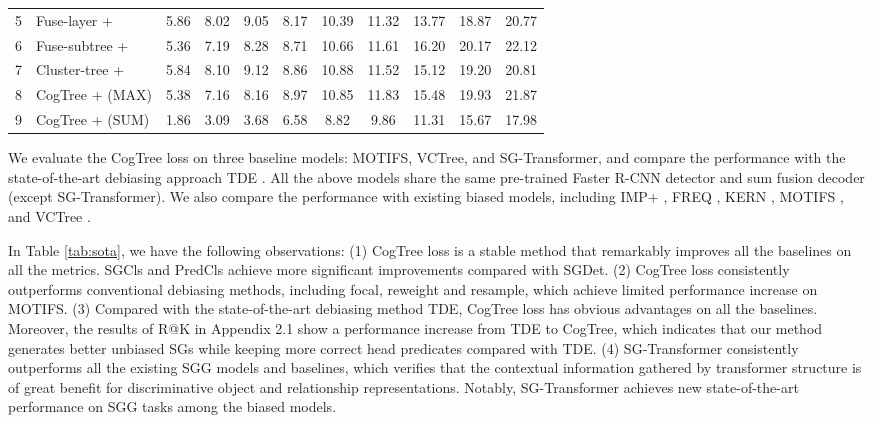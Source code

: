 \documentclass[letterpaper]{article} \usepackage{aaai21}  \usepackage{times}  \usepackage{helvet} \usepackage{courier}  \usepackage[hyphens]{url}  \usepackage{graphicx} \urlstyle{rm} \def\UrlFont{\rm}  \usepackage{natbib}  \usepackage{caption} \frenchspacing  \setlength{\pdfpagewidth}{8.5in}  \setlength{\pdfpageheight}{11in}  \usepackage{amsmath,amsthm}
\begin{document}
\begin{table*}[t]
{\begin{tabular}{llccccccccc}
\\ 
\hline
\multicolumn{1}{l|}{5} & \multicolumn{1}{l|}{Fuse-layer + } & 5.86  & 8.02 & \multicolumn{1}{c|}{9.05}    & 8.17   & 10.39  & \multicolumn{1}{c|}{11.32}   & 13.77         & 18.87        & 20.77          
\\ 
\multicolumn{1}{l|}{6} & \multicolumn{1}{l|}{Fuse-subtree + }  & 5.36  & 7.19  & \multicolumn{1}{c|}{8.28}   & 8.71  & 10.66  & \multicolumn{1}{c|}{11.61}   & 16.20         & 20.17        & 22.12         \\
\multicolumn{1}{l|}{7} & \multicolumn{1}{l|}{Cluster-tree + }  & 5.84  & 8.10 & \multicolumn{1}{c|}{9.12}   & 8.86  & 10.88  & \multicolumn{1}{c|}{11.52}   & 15.12         & 19.20        & 20.81         \\
\hline
\multicolumn{1}{l|}{8} & \multicolumn{1}{l|}{CogTree + (MAX)}  & 5.38  & 7.16 & \multicolumn{1}{c|}{8.16}   & 8.97  & 10.85  & \multicolumn{1}{c|}{11.83}   & 15.48         & 19.93        & 21.87         \\
\multicolumn{1}{l|}{9} & \multicolumn{1}{l|}{CogTree + (SUM)}  & 1.86  & 3.09  & \multicolumn{1}{c|}{3.68}   & 6.58  & 8.82  & \multicolumn{1}{c|}{9.86}   & 11.31         & 15.67        & 17.98   \\      
\hline
\end{tabular}}
\label{tab:ablation}
\end{table*}

We evaluate the CogTree loss on three baseline models: MOTIFS, VCTree, and SG-Transformer, and compare the performance with the state-of-the-art debiasing approach TDE \cite{Tang2020Unbiased}. All the above models share the same pre-trained Faster R-CNN detector and sum fusion decoder (except SG-Transformer). We also compare the performance with existing biased models, including IMP+ \cite{xu2017scene}, FREQ \cite{zellers2018neural}, KERN \cite{chen2019knowledge}, MOTIFS \cite{zellers2018neural}, and VCTree \cite{tang2019learning,Tang2020Unbiased}. 





In Table \ref{tab:sota}, we have the following observations: (1) CogTree loss is a stable method that remarkably improves all the baselines on all the metrics. SGCls and PredCls achieve more significant improvements compared with SGDet. (2) CogTree loss consistently outperforms conventional debiasing methods, including focal, reweight and resample, which achieve limited performance increase on MOTIFS. (3) Compared with the state-of-the-art debiasing method TDE, CogTree loss has obvious advantages on all the baselines. Moreover, the results of R@K in Appendix 2.1 show a performance increase from TDE to CogTree, which indicates that our method generates better unbiased SGs while keeping more correct head predicates compared with TDE. (4) SG-Transformer consistently outperforms all the existing SGG models and baselines, which verifies that the contextual information gathered by transformer structure 
is of great benefit for discriminative object and relationship representations. Notably, SG-Transformer achieves new state-of-the-art performance on SGG tasks among the biased models.
\end{document}
